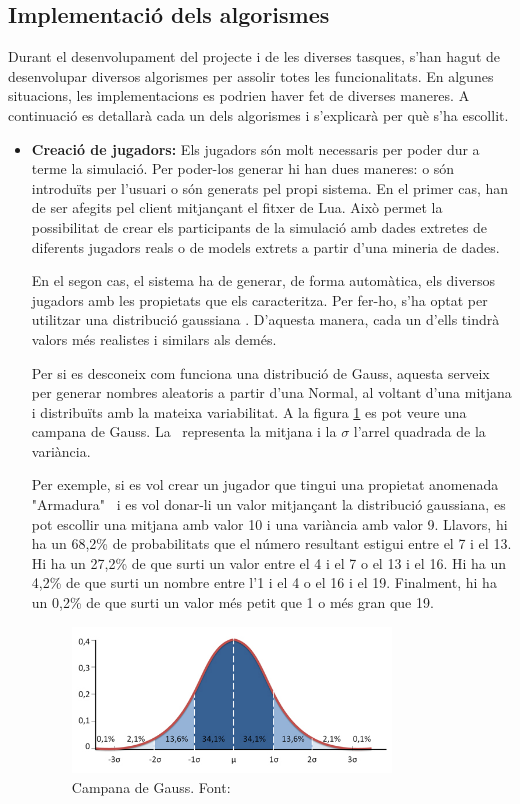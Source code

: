 \documentclass[a4paper]{article}
\begin{document}
\newpage
\subsection{Implementació dels algorismes}
Durant el desenvolupament del projecte i de les diverses tasques, s'han hagut de desenvolupar diversos algorismes per assolir totes les funcionalitats. En algunes situacions, les implementacions es podrien haver fet de diverses maneres. A continuació es detallarà cada un dels algorismes i s'explicarà per què s'ha escollit.

\begin{itemize}
    \item \textbf{Creació de jugadors:} Els jugadors són molt necessaris per poder dur a terme la simulació. Per poder-los generar hi han dues maneres: o són introduïts per l'usuari o són generats pel propi sistema. En el primer cas, han de ser afegits pel client mitjançant el fitxer de Lua. Això permet la possibilitat de crear els participants de la simulació amb dades extretes de diferents jugadors reals o de models extrets a partir d'una mineria de dades.
    
    En el segon cas, el sistema ha de generar, de forma automàtica, els diversos jugadors amb les propietats que els caracteritza. Per fer-ho, s'ha optat per utilitzar una distribució gaussiana \cite{wikipediaGauss}. D'aquesta manera, cada un d'ells tindrà valors més realistes i similars als demés. 
    
    Per si es desconeix com funciona una distribució de Gauss, aquesta serveix per generar nombres aleatoris a partir d'una Normal, al voltant d'una mitjana i distribuïts amb la mateixa variabilitat. A la figura \ref{fig:campanaGaussImage} es pot veure una campana de Gauss. La \textmu \, representa la mitjana i la $\sigma$ l'arrel quadrada de la variància.
    
    Per exemple, si es vol crear un jugador que tingui una propietat anomenada "Armadura" \, i es vol donar-li un valor mitjançant la distribució gaussiana, es pot escollir una mitjana amb valor 10 i una variància amb valor 9. Llavors, hi ha un 68,2\% de probabilitats que el número resultant estigui entre el 7 i el 13. Hi ha un 27,2\% de que surti un valor entre el 4 i el 7 o el 13 i el 16. Hi ha un 4,2\% de que surti un nombre entre l'1 i el 4 o el 16 i el 19. Finalment, hi ha un 0,2\% de que surti un valor més petit que 1 o més gran que 19. 
    
        \begin{figure}[H]
        \centering
        \includegraphics[width=0.8\textwidth]{images/gaussImage.jpg}
        \caption{Campana de Gauss. Font: \cite{campanaGauss}}
        \label{fig:campanaGaussImage}
    \end{figure}
    

\end{itemize}
\end{document}
